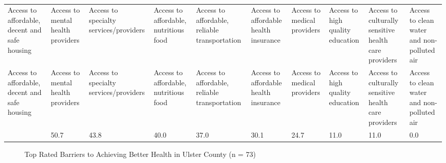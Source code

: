 \documentclass[
  english,
  letterpaper,
]{report}
\begin{document}
\begin{longtable}[]{@{}llllllllll@{}}

\caption{\label{tbl-uc-affect-health}Top Rated Issues That Affect Health
in Ulster County (n = 73)}

\tabularnewline

\caption{}\label{T_c7a21}\tabularnewline
\toprule\noalign{}
Access to affordable, decent and safe housing & Access to mental health
providers & Access to specialty services/providers & Access to
affordable, nutritious food & Access to affordable, reliable
transportation & Access to affordable health insurance & Access to
medical providers & Access to high quality education & Access to
culturally sensitive health care providers & Access to clean water and
non-polluted air \\
\midrule\noalign{}
\endfirsthead
\toprule\noalign{}
Access to affordable, decent and safe housing & Access to mental health
providers & Access to specialty services/providers & Access to
affordable, nutritious food & Access to affordable, reliable
transportation & Access to affordable health insurance & Access to
medical providers & Access to high quality education & Access to
culturally sensitive health care providers & Access to clean water and
non-polluted air \\
\midrule\noalign{}
\endhead
\bottomrule\noalign{}
\endlastfoot
52.1 & 50.7 & 43.8 & 40.0 & 37.0 & 30.1 & 24.7 & 11.0 & 11.0 & 0.0 \\

\end{longtable}

\begin{figure}


\caption{\label{fig-uc-achieve-health}Top Rated Barriers to Achieving
Better Health in Ulster County (n = 73)}

\end{figure}%
\end{document}
